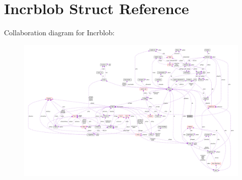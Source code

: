 \hypertarget{structIncrblob}{}\section{Incrblob Struct Reference}
\label{structIncrblob}


Collaboration diagram for Incrblob\+:\nopagebreak
\begin{figure}[H]
\begin{center}
\leavevmode
\includegraphics[width=350pt]{structIncrblob__coll__graph}
\end{center}
\end{figure}

